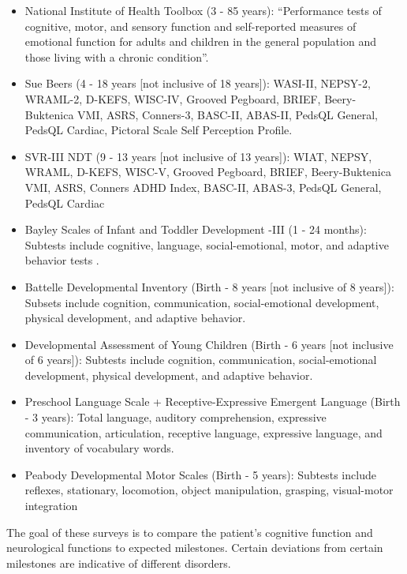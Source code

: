 \begin{itemize}
\item National Institute of Health Toolbox (3 - 85 years): ``Performance tests of cognitive, motor, and sensory function and self-reported measures of emotional function for adults and children in the general population and those living with a chronic condition''.

\item Sue Beers (4 - 18 years [not inclusive of 18 years]): WASI-II, NEPSY-2, WRAML-2, D-KEFS, WISC-IV, Grooved Pegboard, BRIEF, Beery-Buktenica VMI, ASRS, Conners-3, BASC-II, ABAS-II, PedsQL General, PedsQL Cardiac, Pictoral Scale Self Perception Profile.

\item SVR-III NDT (9 - 13 years [not inclusive of 13 years]): WIAT, NEPSY, WRAML, D-KEFS, WISC-V, Grooved Pegboard, BRIEF, Beery-Buktenica VMI, ASRS, Conners ADHD Index, BASC-II, ABAS-3, PedsQL General, PedsQL Cardiac

\item Bayley Scales of Infant and Toddler Development -III (1 - 24 months): Subtests include cognitive, language, social-emotional, motor, and adaptive behavior tests \cite{Mebius2017}.

\item Battelle Developmental Inventory (Birth - 8 years [not inclusive of 8 years]): Subsets include cognition, communication, social-emotional development, physical development, and adaptive behavior.

\item Developmental Assessment of Young Children (Birth - 6 years [not inclusive of 6 years]): Subtests include cognition, communication, social-emotional development, physical development, and adaptive behavior.

\item Preschool Language Scale + Receptive-Expressive Emergent Language (Birth - 3 years): Total language, auditory comprehension, expressive communication, articulation, receptive language, expressive language, and inventory of vocabulary words.

\item Peabody Developmental Motor Scales (Birth - 5 years): Subtests include reflexes, stationary, locomotion, object manipulation, grasping, visual-motor integration
\end{itemize}

The goal of these surveys is to compare the patient's cognitive function and neurological functions to expected milestones. Certain deviations from certain milestones are indicative of different disorders.

